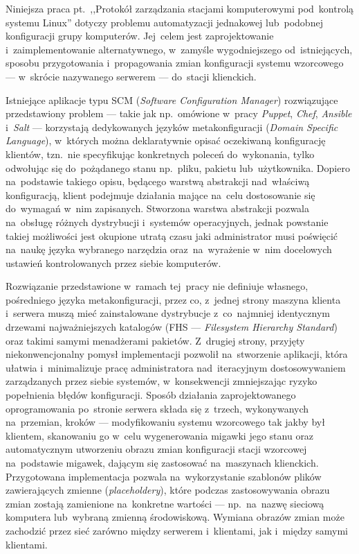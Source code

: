 \documentclass[11pt,a4paper]{article}
\begin{document}
Niniejsza praca pt.~,,Protokół zarządzania stacjami komputerowymi pod~kontrolą systemu Linux'' dotyczy problemu automatyzacji jednakowej lub~podobnej konfiguracji grupy komputerów. Jej~celem jest zaprojektowanie i~zaimplementowanie alternatywnego, w~zamyśle wygodniejszego od~istniejących, sposobu przygotowania i~propagowania zmian konfiguracji systemu wzorcowego --- w~skrócie nazywanego serwerem --- do~stacji klienckich.%

Istniejące aplikacje typu SCM (\emph{Software Configuration Manager}) rozwiązujące przedstawiony problem --- takie jak np.~omówione w~pracy \emph{Puppet}, \emph{Chef}, \emph{Ansible} i~\emph{Salt} --- korzystają dedykowanych języków metakonfiguracji (\emph{Domain Specific Language}), w~których można deklaratywnie opisać oczekiwaną konfigurację klientów, tzn.~nie specyfikując konkretnych poleceń do~wykonania, tylko odwołując się do~pożądanego stanu np.~pliku, pakietu lub~użytkownika. Dopiero na~podstawie takiego opisu, będącego warstwą abstrakcji nad~właściwą konfiguracją, klient podejmuje działania mające na~celu dostosowanie się do~wymagań w~nim zapisanych. Stworzona warstwa abstrakcji pozwala na~obsługę różnych dystrybucji i~systemów operacyjnych, jednak powstanie takiej możliwości jest okupione utratą czasu jaki administrator musi poświęcić na~naukę języka wybranego narzędzia oraz~na~wyrażenie w~nim docelowych ustawień kontrolowanych przez siebie komputerów.

Rozwiązanie przedstawione w~ramach tej~pracy nie definiuje własnego, pośredniego języka metakonfiguracji, przez co, z~jednej strony maszyna klienta i~serwera muszą mieć zainstalowane dystrybucje z~co~najmniej identycznym drzewami najważniejszych katalogów (FHS --- \emph{Filesystem Hierarchy Standard}) oraz takimi samymi menadżerami pakietów. Z~drugiej strony, przyjęty niekonwencjonalny pomysł implementacji pozwolił na~stworzenie aplikacji, która ułatwia i~minimalizuje pracę administratora nad~iteracyjnym dostosowywaniem zarządzanych przez siebie systemów, w~konsekwencji zmniejszając ryzyko popełnienia błędów konfiguracji. Sposób działania zaprojektowanego oprogramowania po~stronie serwera składa się z~trzech, wykonywanych na~przemian, kroków --- modyfikowaniu systemu wzorcowego tak jakby był klientem, skanowaniu go w~celu wygenerowania migawki jego stanu oraz automatycznym utworzeniu obrazu zmian konfiguracji stacji wzorcowej na~podstawie migawek, dającym się zastosować na~maszynach klienckich. Przygotowana implementacja pozwala na~wykorzystanie szablonów plików zawierających zmienne (\emph{placeholdery}), które podczas zastosowywania obrazu zmian zostają zamienione na~konkretne wartości --- np.~na~nazwę sieciową komputera lub~wybraną zmienną środowiskową. Wymiana obrazów zmian może zachodzić przez sieć zarówno między serwerem i~klientami, jak i~między samymi klientami.
\end{document}
